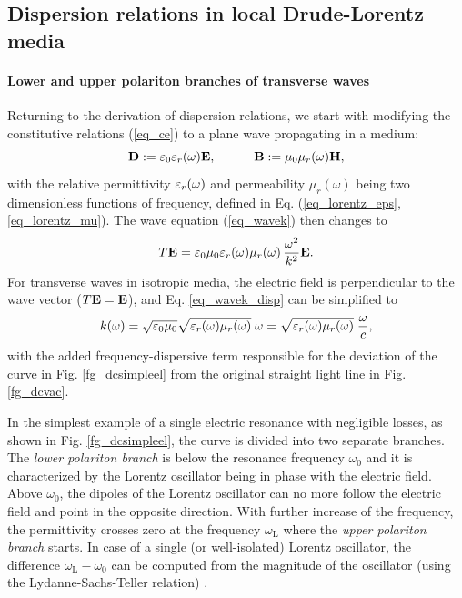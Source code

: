 \subsection{Dispersion relations in local Drude-Lorentz media} \label{disp_rel_local_media}
\paragraph{Lower and upper polariton branches of transverse waves} %
Returning to the derivation of dispersion relations, we start with modifying the constitutive relations (\ref{eq_ce}) to a plane wave propagating in a medium:
\begin{equation}		\mathbf{D} := \varepsilon_0\varepsilon_r(\omega)	\mathbf{E}, \quad\quad\quad						\mathbf{B} := \mu_0\mu_r(\omega)		\mathbf{H},				 \label{eq_ce2}\end{equation}
with the relative permittivity $\varepsilon_r(\omega)$ and permeability $\mu_r(\omega)$ being two dimensionless functions of frequency, defined in Eq. (\ref{eq_lorentz_eps}, \ref{eq_lorentz_mu}). 
The wave equation (\ref{eq_wavek}) then changes to
\begin{equation}  T\mathbf{E} = \varepsilon_0 \mu_0  \varepsilon_r(\omega) \mu_r(\omega) \, \frac{ \omega^{2}}{k^2} \mathbf{E}.  \label{eq_wavek_disp}\end{equation}
For transverse waves in isotropic media, the electric field is perpendicular to the wave vector ($T\mathbf{E} = \mathbf{E}$), and Eq. \ref{eq_wavek_disp} can be simplified to  
\begin{equation} k(\omega) = \sqrt{\varepsilon_0 \mu_0} \sqrt{\varepsilon_r(\omega) \mu_{r}(\omega)}\;\omega = \sqrt{\varepsilon_r(\omega) \mu_{r}(\omega)}\; \frac{\omega}{c}, \label{eq_dispeq_loc}\end{equation}
with the added frequency-dispersive term responsible for the deviation of the curve in Fig. \ref{fg_dcsimpleel} from the original straight light line in Fig. \ref{fg_dcvac}. 

In the simplest example of a single electric resonance with negligible losses, as shown in Fig. \ref{fg_dcsimpleel}, the curve is divided into two separate branches. The \textit{lower polariton branch} is below the resonance frequency $\omega_0$ and it is characterized by the Lorentz oscillator being in phase with the electric field. Above $\omega_0$, the dipoles of the Lorentz oscillator can no more follow the electric field and point in the opposite direction. With further increase of the frequency, the permittivity crosses zero at the frequency $\omega_{\text{L}}$ where the \textit{upper polariton branch} starts. In case of a single (or well-isolated) Lorentz oscillator, the difference $\omega_{\text{L}} - \omega_0$ can be computed from the magnitude of the oscillator (using the Lydanne-Sachs-Teller relation) \cite{klingshirn2007semiconductor}.

